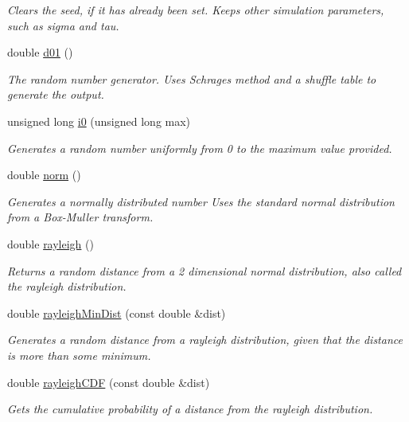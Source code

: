 \begin{DoxyCompactItemize}
\begin{DoxyCompactList}\small\item\em Clears the seed, if it has already been set. Keeps other simulation parameters, such as sigma and tau. \end{DoxyCompactList}\item 
double \hyperlink{class_n_rrand_a0043ba1c33b3dcb3b98210fb432f9f6c}{d01} ()
\begin{DoxyCompactList}\small\item\em The random number generator. Uses Schrage\textquotesingle{}s method and a shuffle table to generate the output. \end{DoxyCompactList}\item 
unsigned long \hyperlink{class_n_rrand_abb6db53dd1fdd9388b39e5dcd26c13ac}{i0} (unsigned long max)
\begin{DoxyCompactList}\small\item\em Generates a random number uniformly from 0 to the maximum value provided. \end{DoxyCompactList}\item 
double \hyperlink{class_n_rrand_aa57a6e9bae94c2df5a00473ba6fa900d}{norm} ()
\begin{DoxyCompactList}\small\item\em Generates a normally distributed number Uses the standard normal distribution from a Box-\/\+Muller transform. \end{DoxyCompactList}\item 
double \hyperlink{class_n_rrand_a39576a34204f90b6cda7dfd92561c0b0}{rayleigh} ()
\begin{DoxyCompactList}\small\item\em Returns a random distance from a 2 dimensional normal distribution, also called the rayleigh distribution. \end{DoxyCompactList}\item 
double \hyperlink{class_n_rrand_aefdaf5521b01658bdd1c206bbe1e855f}{rayleigh\+Min\+Dist} (const double \&dist)
\begin{DoxyCompactList}\small\item\em Generates a random distance from a rayleigh distribution, given that the distance is more than some minimum. \end{DoxyCompactList}\item 
double \hyperlink{class_n_rrand_a2723a59dd63c61886238c2d466831985}{rayleigh\+C\+DF} (const double \&dist)
\begin{DoxyCompactList}\small\item\em Gets the cumulative probability of a distance from the rayleigh distribution. \end{DoxyCompactList}\item 

\end{DoxyCompactItemize}
